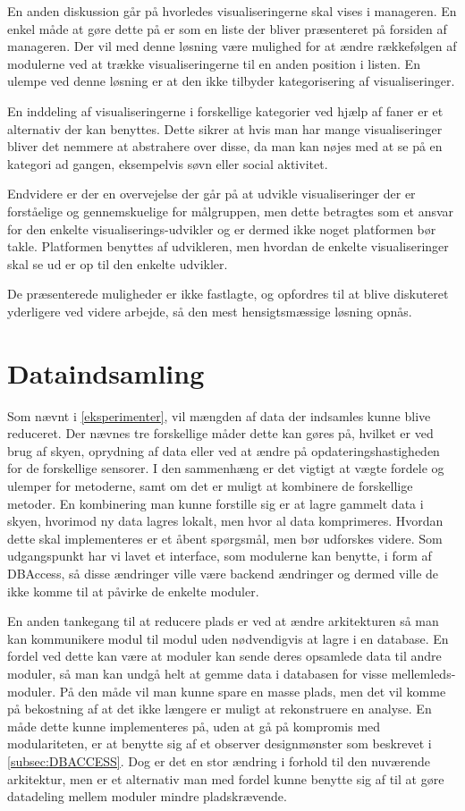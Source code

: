 En anden diskussion går på hvorledes visualiseringerne skal vises i manageren.
En enkel måde at gøre dette på er som en liste der bliver præsenteret på forsiden af manageren.
Der vil med denne løsning være mulighed for at ændre rækkefølgen af modulerne ved at trække visualiseringerne til en anden position i listen.
En ulempe ved denne løsning er at den ikke tilbyder kategorisering af visualiseringer.

En inddeling af visualiseringerne i forskellige kategorier ved hjælp af faner er et alternativ der kan benyttes.
Dette sikrer at hvis man har mange visualiseringer bliver det nemmere at abstrahere over disse, da man kan nøjes med at se på en kategori ad gangen, eksempelvis søvn eller social aktivitet.

Endvidere er der en overvejelse der går på at udvikle visualiseringer der er forståelige og gennemskuelige for målgruppen, men dette betragtes som et ansvar for den enkelte visualiserings-udvikler og er dermed ikke noget platformen bør takle.
Platformen benyttes af udvikleren, men hvordan de enkelte visualiseringer skal se ud er op til den enkelte udvikler.

De præsenterede muligheder er ikke fastlagte, og opfordres til at blive diskuteret yderligere ved videre arbejde, så den mest hensigtsmæssige løsning opnås.

\section{Dataindsamling}
Som nævnt i \cref{eksperimenter}, vil mængden af data der indsamles kunne blive reduceret.
Der nævnes tre forskellige måder dette kan gøres på, hvilket er ved brug af skyen, oprydning af data eller ved at ændre på opdateringshastigheden for de forskellige sensorer.
I den sammenhæng er det vigtigt at vægte fordele og ulemper for metoderne, samt om det er muligt at kombinere de forskellige metoder.
En kombinering man kunne forstille sig er at lagre gammelt data i skyen, hvorimod ny data lagres lokalt, men hvor al data komprimeres.
Hvordan dette skal implementeres er et åbent spørgsmål, men bør udforskes videre.
Som udgangspunkt har vi lavet et interface, som modulerne kan benytte, i form af DBAccess, så disse ændringer ville være backend ændringer og dermed ville de ikke komme til at påvirke de enkelte moduler.

En anden tankegang til at reducere plads er ved at ændre arkitekturen så man kan kommunikere modul til modul uden nødvendigvis at lagre i en database.
En fordel ved dette kan være at moduler kan sende deres opsamlede data til andre moduler, så man kan undgå helt at gemme data i databasen for visse mellemleds-moduler.
På den måde vil man kunne spare en masse plads, men det vil komme på bekostning af at det ikke længere er muligt at rekonstruere en analyse. En måde dette kunne implementeres på, uden at gå på kompromis med modulariteten, er at benytte sig af et observer designmønster som beskrevet i \cref{subsec:DBACCESS}.
Dog er det en stor ændring i forhold til den nuværende arkitektur, men er et alternativ man med fordel kunne benytte sig af til at gøre datadeling mellem moduler mindre pladskrævende.

